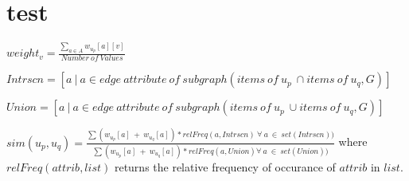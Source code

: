 \documentclass[a4paper,10pt]{article}
\title{}
\author{}
\begin{document}
\maketitle

\begin{abstract}

\end{abstract}

\section{test}
$weight_v = \frac{\sum_{a \in A} w_{u_p}[a][v]}{Number\ of\ Values}$
\newline

$Intrscn = [a\ |\ a \in edge\ attribute\ of\ subgraph(items\ of\ u_p\ \cap items\ of\ u_q, G)]$\\
\newline

$Union = [a\ |\ a \in edge\ attribute\ of\ subgraph(items\ of\ u_p\ \cup items\ of\ u_q, G)]$\\
\newline

$sim(u_p, u_q) = \frac{\sum (w_{u_p}[a]\ +\ w_{u_q}[a])*relFreq(a, Intrscn)\ \forall\ a\ \in\ set(Intrscn))}{\sum (w_{u_p}[a]\ +\ w_{u_q}[a])*relFreq(a, Union) \forall\ a\ \in\ set(Union))}$
\newline
where $relFreq(attrib, list)$ returns the relative frequency of occurance of $attrib$ in $list$.
\end{document}
